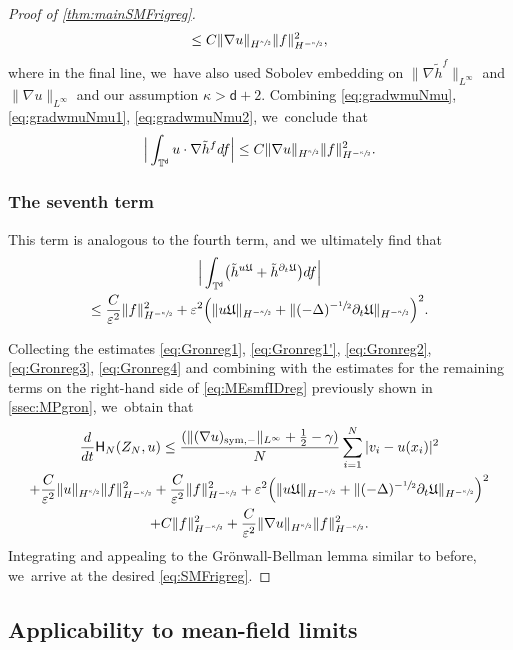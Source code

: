 \documentclass[10pt]{amsart}
\newcommand{\sym}{\textup{sym}}
\theoremstyle{plain}
\theoremstyle{definition}
\DeclarePairedDelimiter{\pa}{\lparen}{\rparen}
\let\div\relax
\DeclareMathOperator{\div}{\mathrm{div}}
\newcommand{\T}{{\mathbb{T}}}
\let\ga\gamma
\let\vep\varepsilon
\let\ka\kappa
\let\nab\nabla
\let\p\partial
\let\tl\tilde
\let\uz Z
\newcommand{\Uu}{\mathfrak{U}}
\newcommand{\Hr}{\mathsf{H}}
\renewcommand{\d}{\mathsf{d}}
\begin{document}
\begin{proof}[Proof of \cref{thm:mainSMFrigreg}]
\begin{multline}
\le C\|\nab u\|_{H^{\sfrac\ka2}} \|f\|_{H^{-\sfrac\ka2}}^2, 
\end{multline}
where in the final line, we~have also used Sobolev embedding on $\|\nab\tl{h}^{f}\|_{L^\infty}$ and $\|\nab u\|_{L^\infty}$ and our assumption {$\ka>\d+2$}.
Combining \eqref{eq:gradwmuNmu}, \eqref{eq:gradwmuNmu1}, \eqref{eq:gradwmuNmu2}, we~conclude that
\begin{equation}\label{eq:Gronreg3}
\Big|\int_{\T^\d}u\cdot \nab\tl{h}^f df\Big| \le C\|\nab u\|_{H^{\sfrac\ka2}} \|f\|_{H^ {-\sfrac{\ka}{2}}}^2.
\end{equation}

\subsubsection*{The seventh term} This term is analogous to the fourth term, and we ultimately find that
\begin{multline}\label{eq:Gronreg4}
\Big|\int_{\T^\d}\pa*{\div \tl{h}^{u\Uu}+\tl{h}^{\p_t\Uu}}df\Big|\\
\le \frac{C}{\vep^2}\|f\|_{H^ {-\sfrac{\ka}{2}}}^2 + \vep^2 \Bigl( \|u\Uu\|_{H^ {-\sfrac{\ka}{2}}} + \|(-\Delta)^{-\sfrac{1}{2}}\p_t \Uu\|_{H^ {-\sfrac{\ka}{2}}}\Bigr)^2.
\end{multline}

Collecting the estimates \eqref{eq:Gronreg1}, \eqref{eq:Gronreg1'}, \eqref{eq:Gronreg2}, \eqref{eq:Gronreg3}, \eqref{eq:Gronreg4} and combining with the estimates for the remaining terms on the right-hand side of \eqref{eq:MEsmfIDreg} previously shown in \cref{ssec:MPgron}, we~obtain that
\begin{multline*}
\frac{d}{dt}\Hr_{N}(\uz_N,u) \le \frac{(\| (\nab u)_{\sym,-} \|_{L^\infty}+\frac12-\ga)}{N}\sum_{i=1}^N |v_i-u(x_i)|^2 \\
+ \frac{C}{\vep^2}\|u\|_{H^{\sfrac\ka2}}\|f\|_{H^{-\sfrac{\ka}2}}^2 + \frac{C}{\vep^2}\|f\|_{H^ {-\sfrac{\ka}{2}}}^2 + \vep^2 \Big( \|u\Uu\|_{H^ {-\sfrac{\ka}{2}}} + \|(-\Delta)^{-\sfrac{1}{2}}\p_t \Uu\|_{H^ {-\sfrac{\ka}{2}}}\Big)^2\\
+ C\|f\|_{H^ {-\sfrac{\ka}{2}}}^2 + \frac{C}{\vep^2}\|\nab u\|_{H^{\sfrac\ka2}}\|f\|_{H^{-\sfrac\ka2}}^2.
\end{multline*}
Integrating and appealing to the Grönwall-Bellman lemma similar to before, we~arrive at the desired \eqref{eq:SMFrigreg}.
\end{proof}

\subsection{Applicability to mean-field limits}\label{ssec:appregMF}
\end{document}
